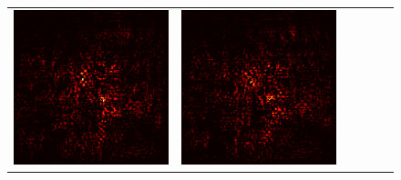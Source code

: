 \documentclass[preprint,12pt]{elsarticle}
\begin{document}
\begin{figure}[p]
\begin{tabular}{cccccc}
  \includegraphics[scale=\scale]{../visualizations/examples/imagenette/resnet18/active_saliency_map/3.png} & 
  \includegraphics[scale=\scale]{../visualizations/examples/imagenette/resnet18/inactive_saliency_map/3.png} \\
  

\end{tabular}
\end{figure}
\end{document}
